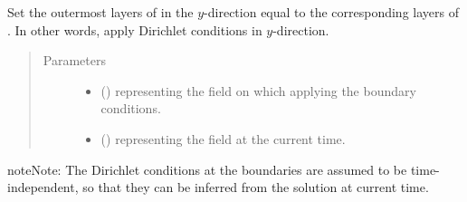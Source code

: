 \documentclass[letterpaper,10pt,english]{sphinxmanual}
\begin{document}
\begin{fulllineitems}
\begin{fulllineitems}
\begin{quote}
\begin{description}
\end{description}\end{quote}

\end{fulllineitems}


\begin{fulllineitems}
\label{\detokenize{api:tasmania.dycore.horizontal_boundary_relaxed.RelaxedYZ.set_outermost_layers_y}}
Set the outermost layers of  in the \(y\)-direction equal to the corresponding
layers of . In other words, apply Dirichlet conditions in \(y\)-direction.
\begin{quote}\begin{description}
\item[{Parameters}] \leavevmode\begin{itemize}
\item {} 
 () \textendash{}  representing the field on which applying the boundary conditions.

\item {} 
 () \textendash{}  representing the field at the current time.

\end{itemize}

\end{description}\end{quote}

\begin{sphinxadmonition}{note}{Note:}
The Dirichlet conditions at the boundaries are assumed to be time-independent, so that they
can be inferred from the solution at current time.
\end{sphinxadmonition}

\end{fulllineitems}


\end{fulllineitems}
\end{document}
